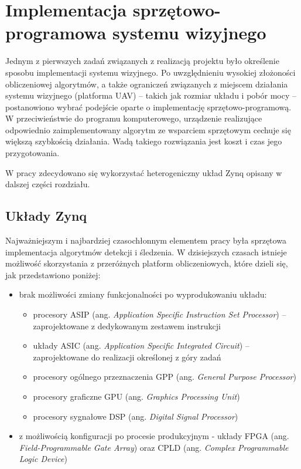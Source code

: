 \chapter{Implementacja sprzętowo-programowa systemu wizyjnego}

Jednym z pierwszych zadań związanych z realizacją projektu było określenie sposobu implementacji systemu wizyjnego.
Po uwzględnieniu wysokiej złożoności obliczeniowej algorytmów, a także ograniczeń związanych z miejscem działania systemu wizyjnego (platforma UAV) -- takich jak rozmiar układu i pobór mocy -- postanowiono wybrać podejście oparte o implementację sprzętowo-programową. W przeciwieństwie do programu komputerowego, urządzenie realizujące odpowiednio zaimplementowany algorytm ze wsparciem sprzętowym cechuje się większą szybkością działania. Wadą takiego rozwiązania jest koszt i czas jego przygotowania. 

W pracy zdecydowano się wykorzystać heterogeniczny układ Zynq opisany w dalszej części rozdziału. 



\section{Układy Zynq}


Najważniejszym i najbardziej czasochłonnym elementem pracy była sprzętowa implementacja algorytmów detekcji i śledzenia. 
W dzisiejszych czasach istnieje możliwość skorzystania z przeróżnych platform obliczeniowych, które dzieli się, jak przedstawiono poniżej:
\begin{itemize}
	\item brak możliwości zmiany funkcjonalności po wyprodukowaniu układu:
	\begin{itemize}
		\item procesory ASIP (ang. \textit{Application Specific Instruction Set Processor}) -- zaprojektowane z dedykowanym zestawem instrukcji		
		\item układy ASIC (ang. \textit{Application Specific Integrated Circuit}) -- zaprojektowane do realizacji określonej z góry zadań
		\item procesory ogólnego przeznaczenia GPP (ang. \textit{General Purpose Processor})
		\item procesory graficzne GPU (ang. \textit{Graphics Processing Unit})
		\item procesory sygnałowe DSP (ang. \textit{Digital Signal Processor})
	\end{itemize}
	\item z możliwością konfiguracji po procesie produkcyjnym - układy FPGA (ang. \textit{Field-Programmable Gate Array}) oraz CPLD (ang. \textit{Complex Programmable Logic Device})
\end{itemize}

